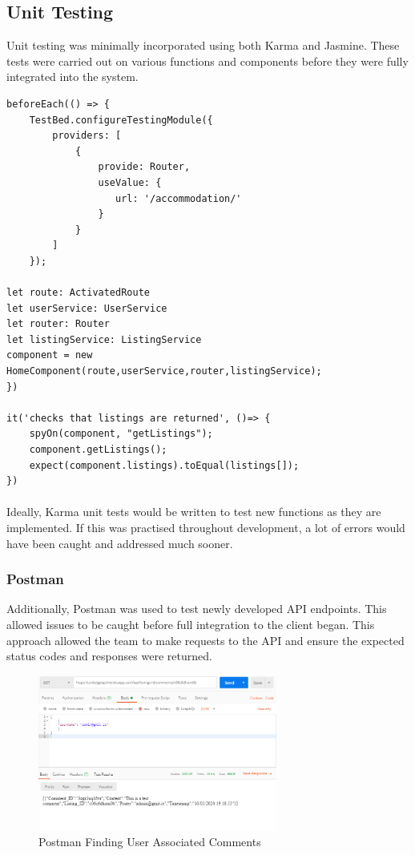 \subsection{Unit Testing}
Unit testing was minimally incorporated using both Karma and Jasmine. These tests were carried out on various functions and components before they were fully integrated into the system. \newline

\begin{lstlisting}[caption=Testing with Karma]
beforeEach(() => {
    TestBed.configureTestingModule({
        providers: [
            {
                provide: Router,
                useValue: {
                   url: '/accommodation/'
                } 
            }
        ]
    });

let route: ActivatedRoute
let userService: UserService
let router: Router
let listingService: ListingService
component = new HomeComponent(route,userService,router,listingService);
})

it('checks that listings are returned', ()=> {
    spyOn(component, "getListings");
    component.getListings();
    expect(component.listings).toEqual(listings[]);
})
\end{lstlisting}

\paragraph{}
Ideally, Karma unit tests would be written to test new functions as they are implemented. If this was practised throughout development, a lot of errors would have been caught and addressed much sooner.

\subsubsection{Postman}
Additionally, Postman was used to test newly developed API endpoints. This allowed issues to be caught before full integration to the client began. This approach allowed the team to make requests to the API and ensure the expected status codes and responses were returned.

\begin{figure}[H]
	\caption{Postman Finding User Associated Comments}
	\label{image:waterfall}
	\centering
	\includegraphics[width=0.70\textwidth]{images/postman_ex.png}
\end{figure}	

